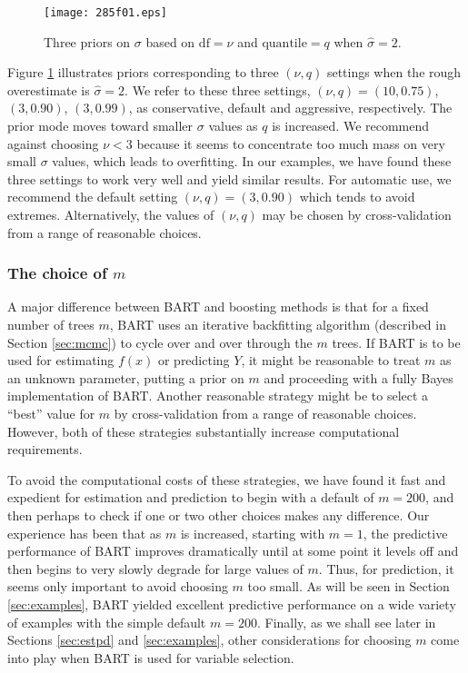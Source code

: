 \documentclass[aoas,nameyear,dvips]{arximspdf}
\begin{document}
\begin{figure}

\texttt{[image: 285f01.eps]}

\caption{Three priors on $\sigma$ based on $\mathrm{df} = \nu$ and $\mathrm{quantile} = q$
when $\hat \sigma = 2$.}\label{fig:sigmaprior}
\end{figure}

Figure \ref{fig:sigmaprior} illustrates priors corresponding to
three $(\nu, q)$ settings when the rough overestimate is
$\hat{\sigma}=2$.  We refer to these three settings, $(\nu, q) =
(10, 0.75)$, $(3, 0.90)$, $(3, 0.99)$, as conservative, default
and aggressive, respectively.  The prior mode moves toward
smaller $\sigma$ values as $q$ is increased.  We recommend against
choosing $\nu < 3$ because it seems to concentrate too much mass
on very small $\sigma$ values, which leads to overfitting. In our
examples, we have found these three settings to work very well and
yield similar results.  For automatic use, we recommend the
default setting $(\nu, q) = (3, 0.90)$ which tends to avoid
extremes.  Alternatively, the values of $(\nu, q)$ may be chosen by
cross-validation from a range of
reasonable choices.


\subsubsection{The choice of $m$}\label{sec:numtrees}

A major difference between BART and  boosting methods is that for a
fixed number of trees $m$,  BART uses an iterative backfitting
algorithm (described in Section \ref{sec:mcmc}) to cycle over and over
through the $m$ trees.  If BART is to be used for estimating $f(x)$ or
predicting $Y$, it might be reasonable to treat  $m$ as an unknown
parameter, putting a prior on $m$ and proceeding with a fully Bayes
implementation of BART.  Another reasonable strategy might be to select
a ``best'' value for $m$ by cross-validation from a range of reasonable
choices.  However, both of these strategies substantially increase
computational requirements.

To avoid the computational costs of these strategies, we have found it
fast and expedient for estimation and prediction to begin with a
default of $m = 200$, and then perhaps to check if one or two other
choices makes any difference.  Our experience has been that as $m$ is
increased, starting with $m = 1$, the predictive performance of BART
improves dramatically until at some point it levels off  and then
begins to very slowly degrade for large values of $m$.   Thus, for
prediction, it seems only important to avoid choosing $m$ too small.
As will be seen in Section \ref{sec:examples},  BART yielded excellent
predictive performance on a wide variety of examples with the simple
default $m = 200$.  Finally, as we shall see later in Sections
\ref{sec:estpd} and \ref{sec:examples}, other considerations for
choosing $m$ come into play when BART is used for variable selection.
\end{document}
